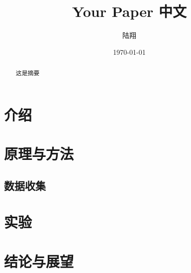 \documentclass{article}
\title{Your Paper 中文}
\author{陆翔}
\date{\today}
\begin{document}
\maketitle

\begin{abstract}
    这是摘要
\end{abstract}

\newpage
\begin{center}
    \tableofcontents
\end{center}

\newpage
\section{介绍}


\section{原理与方法}
\subsection{数据收集}



\newpage
\section{实验}

\section{结论与展望}
\end{document}
